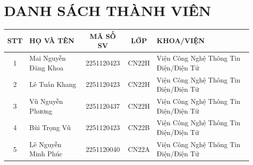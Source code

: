 \chapter*{DANH SÁCH THÀNH VIÊN}

\begin{table}[h]
\centering
\begin{tabularx}{\textwidth}{|c|l|c|c|X|}
\hline
\textbf{STT} & \textbf{HỌ VÀ TÊN} & \textbf{MÃ SỐ SV} & \textbf{LỚP} & \textbf{KHOA/VIỆN} \\ \hline
1 & Mai Nguyễn Đăng Khoa & 2251120423 & CN22H & Viện Công Nghệ Thông Tin Điện/Điện Tử \\ \hline
2 & Lê Tuấn Khang         & 2251120423 & CN22H & Viện Công Nghệ Thông Tin Điện/Điện Tử \\ \hline
3 & Vũ Nguyễn Phương      & 2251120437 & CN22H & Viện Công Nghệ Thông Tin Điện/Điện Tử \\ \hline
4 & Bùi Trọng Vũ          & 2251120423 & CN22B & Viện Công Nghệ Thông Tin Điện/Điện Tử \\ \hline
5 & Lê Nguyễn Minh Phúc   & 2251120040 & CN22A & Viện Công Nghệ Thông Tin Điện/Điện Tử \\ \hline
\end{tabularx}
\end{table}